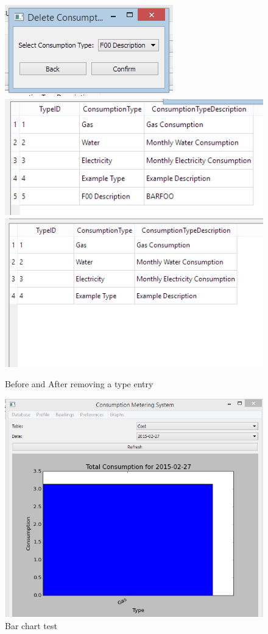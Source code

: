 \begin{figure}[H]
	\includegraphics{./testing/images/test_4_5_remove_type_data.png}
	\includegraphics{./testing/images/test_4_5_remove_type_before.png}
	\includegraphics{./testing/images/test_4_5_remove_type_after.png}
	\caption{Before and After removing a type entry} \label{fig:test_4.5_result}
\end{figure}

\begin{figure}[H]
	\includegraphics{./testing/images/test_5_1_barchart.png}
	\caption{Bar chart test} \label{fig:test_5.1_results}
\end{figure}

